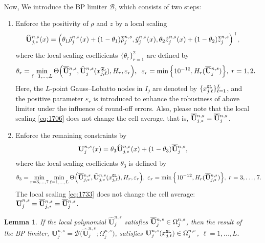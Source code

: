 \documentclass[times,final]{elsarticle}
\newtheorem{lemma}[theorem]{Lemma}
\numberwithin{equation}{section}
\theoremstyle{definition}
\theoremstyle{remark}
\newcommand{\BU}{\mathbf{U}}
\newcommand{\hBU}{\widehat{\BU}}
\newcommand{\oBU}{\overline{\BU}}
\newcommand{\hoBU}{
	\mathrlap{
		\raisebox{1.2 pt}{$\overline{\phantom{\mathbf{U}}}$}
	}
	\mathrlap{
		\raisebox{-0.9 pt}{$\widehat{\phantom{\mathbf{U}}}$}
	}
	\mathbf{U}
}
\newcommand{\hbr}{
	\mathrlap{
		\raisebox{1.4 pt}{$\bar{\phantom{\rho}}$}
	}
	\mathrlap{
		\raisebox{-0.4 pt}{$\hat{\phantom{\rho}}$}
	}
	\rho
}
\newcommand{\hbz}{
	\mathrlap{
		\raisebox{1.4 pt}{$\bar{\phantom{z}}$}
	}
	\mathrlap{
		\raisebox{-0.4 pt}{$\hat{\phantom{z}}$}
	}
	z
}
\begin{document}
Now, We introduce the BP limiter $\mathcal{B}$, which consists of two steps:
\begin{enumerate}[label=(\roman*),leftmargin=6mm]
	
	\item[\textbf{Step 1}:]	Enforce the positivity of $\rho$ and $z$ by a local scaling
	\begin{equation}\label{eq:1706}
		\hBU_{j,*}^{n,s}(x)
		=
		\Big(
		\theta_1 \hat\rho_j^{n,s}(x) +(1-\theta_1)\hbr_j^{n,s}, 
		\hat y_j^{n,s}(x), 
		\theta_2 \hat z_j^{n,s}(x) +(1-\theta_2)\hbz_j^{n,s}
		\Big)^\top,
	\end{equation}
	where the local scaling coefficients $\{\theta_r\}_{r = 1}^2$ are defined by
	\[
	\theta_r = \min_{\ell = 1,\dots,L}
	\Theta\Big(\hoBU_j^{n,s},\hBU_j^{n,s} (x^{\tt GL}_{j,\ell}),H_r,\varepsilon_r\Big), \;\;
	\varepsilon_r = \min \Big\{ 10^{-12} , H_r(\hoBU_j^{n,s}) \Big\},\; r = 1,2.
	\]
	Here, the $L$-point Gauss--Lobatto nodes in $I_j$ are denoted by $\{x^{\tt GL}_{j,\ell} \}_{\ell = 1}^L$, and the positive parameter $\varepsilon_r$ is introduced to enhance the robustness of above limiter under the influence of round-off errors. Also, please note that the local scaling \eqref{eq:1706} does not change the cell average, that is, $\hoBU_{j,*}^{n,s} = \hoBU_{j}^{n,s}$.
	
	\item[\textbf{Step 2}:]Enforce the remaining constraints by
	\begin{equation}\label{eq:1733}
		\BU_j^{n,s}(x) 
		=
		\theta_3 \hBU_{j,*}^{n,s}(x)
		+
		(1-\theta_3) \hoBU_{j}^{n,s},
	\end{equation}
	where the local scaling coefficients $\theta_3$ is defined by
	\[
	\theta_3 = \min_{r = 3,\dots,7} \min_{\ell = 1,\dots,L}
	\Theta\Big(\hoBU_{j,*}^{n,s},\hBU_{j,*}^{n,s} (x^{\tt GL}_{j,\ell}),H_r,\varepsilon_r\Big), \;
	\varepsilon_r = \min \Big\{ 10^{-12} , H_r(\hoBU_{j,*}^{n,s}) \Big\},\; r = 3,\dots,7.
	\]
	The local scaling \eqref{eq:1733} does not change the cell average: $\oBU_{j}^{n,s} = \hoBU_{j,*}^{n,s} = \hoBU_{j}^{n,s}$.
\end{enumerate}

\begin{lemma}\label{lem:1775}
	If the local polynomial $\hBU^{n,s}_j$ satisfies $\hoBU^{n,s}_j \in \Omega^{n,s}_j$, then the result of the BP limiter, $\BU^{n,s}_j = \mathcal{B}\big(\hBU^{n,s}_j;\Omega^{n,s}_j\big)$, satisfies
	$\BU^{n,s}_j(x^{\tt GL}_{j,\ell}) \in \Omega^{n,s}_j$,  $\ell = 1,\dots,L$.
\end{lemma}
\end{document}
